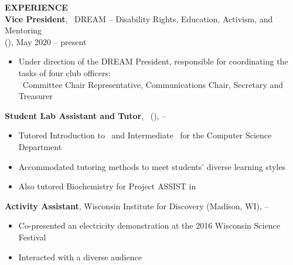 \textbf{EXPERIENCE}\\


\textbf{Vice President}, \UWW \  DREAM -- Disability Rights,  Education, Activism, and Mentoring\\
(\UlocA), May 2020 -- present\\  %
\begin{itemize}
\setlength\itemsep{0pt}
\item Under direction of the DREAM President, responsible for coordinating the tasks of four club officers:\\ 
\ Committee Chair Representative, Communications Chair, Secretary and Treasurer\\
\end{itemize}
\textbf{Student Lab Assistant and Tutor}, \UWW \ (\UlocA),   -- \\
\begin{itemize}
\setlength\itemsep{0pt}
\item Tutored Introduction to \J \ and Intermediate \J \ for the Computer Science Department\\
\item Accommodated tutoring methods to meet students\textquoteright{} diverse learning styles\\
\item Also tutored Biochemistry for Project ASSIST in \\
\end{itemize}
\textbf{Activity Assistant}, Wisconsin Institute for Discovery (Madison, WI),  -- \\
\begin{itemize}
\setlength\itemsep{0pt}
\item Co-presented an electricity demonstration at the 2016 Wisconsin Science Festival\\ 
\item Interacted with a diverse audience\\
\end{itemize}
